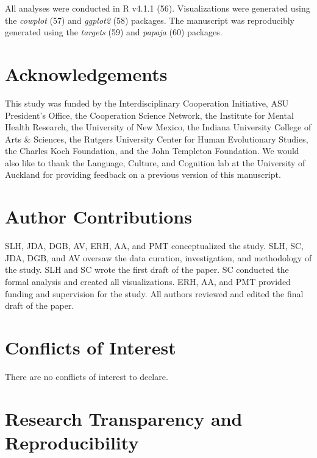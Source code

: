 \documentclass[
  man, donotrepeattitle,floatsintext]{apa6}
\begin{document}
All analyses were conducted in R v4.1.1 (56). Visualizations were generated using the \emph{cowplot} (57) and \emph{ggplot2} (58) packages. The manuscript was reproducibly generated using the \emph{targets} (59) and \emph{papaja} (60) packages.

\newpage

\hypertarget{acknowledgements}{%
\section{Acknowledgements}\label{acknowledgements}}

This study was funded by the Interdisciplinary Cooperation Initiative, ASU President's Office, the Cooperation Science Network, the Institute for Mental Health Research, the University of New Mexico, the Indiana University College of Arts \& Sciences, the Rutgers University Center for Human Evolutionary Studies, the Charles Koch Foundation, and the John Templeton Foundation. We would also like to thank the Language, Culture, and Cognition lab at the University of Auckland for providing feedback on a previous version of this manuscript.

\hypertarget{author-contributions}{%
\section{Author Contributions}\label{author-contributions}}

SLH, JDA, DGB, AV, ERH, AA, and PMT conceptualized the study. SLH, SC, JDA, DGB, and AV oversaw the data curation, investigation, and methodology of the study. SLH and SC wrote the first draft of the paper. SC conducted the formal analysis and created all visualizations. ERH, AA, and PMT provided funding and supervision for the study. All authors reviewed and edited the final draft of the paper.

\hypertarget{conflicts-of-interest}{%
\section{Conflicts of Interest}\label{conflicts-of-interest}}

There are no conflicts of interest to declare.

\hypertarget{research-transparency-and-reproducibility}{%
\section{Research Transparency and Reproducibility}\label{research-transparency-and-reproducibility}}
\end{document}

